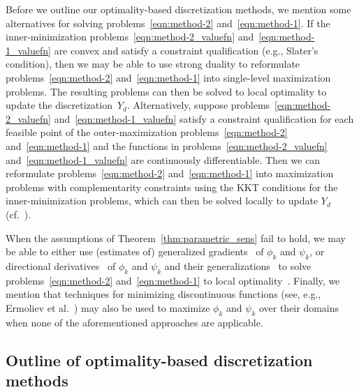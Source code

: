 \documentclass{article}
\newcommand{\1}[1]{\mathds{1}\left[#1\right]}
\begin{document}
Before we outline our optimality-based discretization methods, we mention some alternatives for solving problems~\eqref{eqn:method-2} and~\eqref{eqn:method-1}.
If the inner-minimization problems~\eqref{eqn:method-2_valuefn} and~\eqref{eqn:method-1_valuefn} are convex and satisfy a constraint qualification (e.g., Slater's condition), then we may be able to use strong duality to reformulate problems~\eqref{eqn:method-2} and~\eqref{eqn:method-1} into single-level maximization problems.
The resulting problems can then be solved to local optimality to update the discretization~$Y_d$.
Alternatively, suppose problems~\eqref{eqn:method-2_valuefn} and~\eqref{eqn:method-1_valuefn} satisfy a constraint qualification for each feasible point of the outer-maximization problems~\eqref{eqn:method-2} and~\eqref{eqn:method-1} and the functions in problems~\eqref{eqn:method-2_valuefn} and~\eqref{eqn:method-1_valuefn} are continuously differentiable.
Then we can reformulate problems~\eqref{eqn:method-2} and~\eqref{eqn:method-1} into maximization problems with complementarity constraints using the KKT conditions for the inner-minimization problems, which can then be solved locally to update $Y_d$ (cf.\ \cite{stein2003solving}).


When the assumptions of Theorem~\ref{thm:parametric_sens} fail to hold, we may be able to either use (estimates of) generalized gradients~\cite{dempe2017bilevel,mordukhovich2009subgradients} of $\phi_k$ and $\psi_k$, or directional derivatives~\cite{ralph1995directional} of $\phi_k$ and $\psi_k$ and their generalizations~\cite{stechlinski2018generalized,stechlinski2019generalized} to solve problems~\eqref{eqn:method-2} and~\eqref{eqn:method-1} to local optimality~\cite{burke2020gradient}.
Finally, we mention that techniques for minimizing discontinuous functions (see, e.g., Ermoliev et al.\ \cite{ermoliev1995minimization}) may also be used to maximize $\phi_k$ and $\psi_k$ over their domains when none of the aforementioned approaches are applicable.





\subsection{Outline of optimality-based discretization methods}
\label{subsec:algorithm_outlines}
\end{document}
